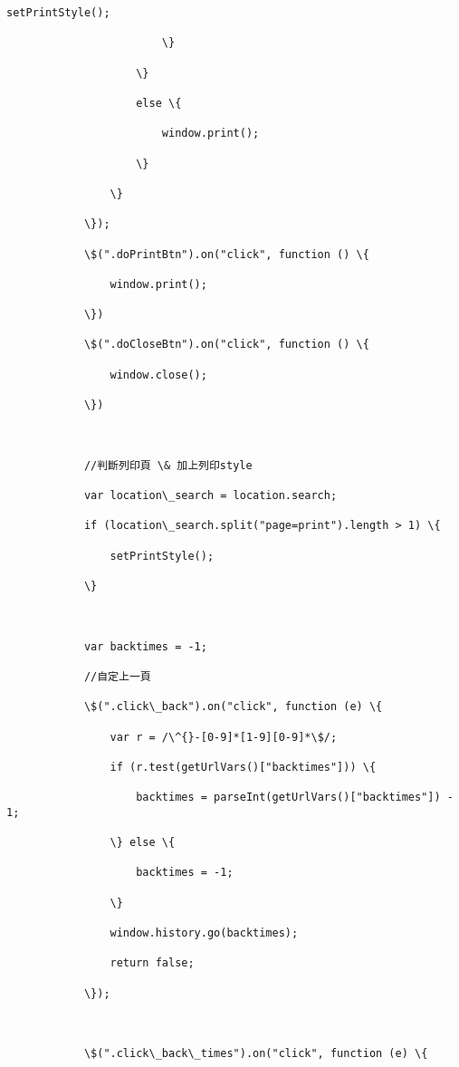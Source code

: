 \documentclass[11pt]{article}
\begin{document}
\begin{Verbatim}[commandchars=\\\{\}]
                            setPrintStyle();

                        \}

                    \}

                    else \{

                        window.print();

                    \}

                \}

            \});

            \$(".doPrintBtn").on("click", function () \{

                window.print();

            \})

            \$(".doCloseBtn").on("click", function () \{

                window.close();

            \})



            //判斷列印頁 \& 加上列印style

            var location\_search = location.search;

            if (location\_search.split("page=print").length > 1) \{

                setPrintStyle();

            \}



            var backtimes = -1;

            //自定上一頁

            \$(".click\_back").on("click", function (e) \{

                var r = /\^{}-[0-9]*[1-9][0-9]*\$/;

                if (r.test(getUrlVars()["backtimes"])) \{

                    backtimes = parseInt(getUrlVars()["backtimes"]) - 1;

                \} else \{

                    backtimes = -1;

                \}

                window.history.go(backtimes);

                return false;

            \});



            \$(".click\_back\_times").on("click", function (e) \{


\end{Verbatim}
\end{document}
